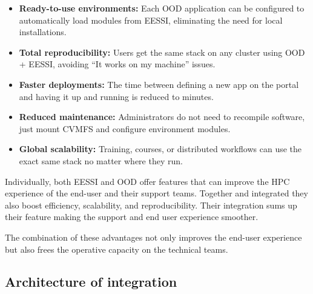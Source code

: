 \documentclass[11pt,a4paper]{article}
\begin{document}
\begin{itemize}
    \item \textbf{Ready-to-use environments:} Each OOD application can be configured to automatically load modules from EESSI, eliminating the need for local installations.
    \item \textbf{Total reproducibility:} Users get the same stack on any cluster using OOD + EESSI, avoiding “It works on my machine” issues.
    \item \textbf{Faster deployments:} The time between defining a new app on the portal and having it up and running is reduced to minutes.
    \item \textbf{Reduced maintenance:} Administrators do not need to recompile software, just mount CVMFS and configure environment modules.
    \item \textbf{Global scalability:} Training, courses, or distributed workflows can use the exact same stack no matter where they run.
\end{itemize}

Individually, both EESSI and OOD offer features that can improve the HPC experience of the end-user and their support teams. Together and integrated they also boost efficiency, scalability, and reproducibility. Their integration sums up their feature making the support and end user experience smoother.

The combination of these advantages not only improves the end-user experience but also frees the operative capacity on the technical teams.

\subsection{Architecture of integration}
\end{document}
